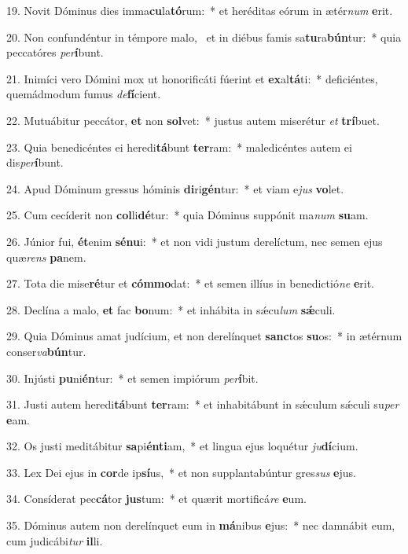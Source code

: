 19. Novit Dóminus dies imma\textbf{cu}la\textbf{tó}rum:~*  et heréditas eórum in ætér\textit{num} \textbf{e}rit.\

20. Non confundéntur in témpore malo, \dag\  et in diébus famis sa\textbf{tu}ra\textbf{bún}tur:~*  quia peccatóres \textit{per}\textbf{í}bunt.\

21. Inimíci vero Dómini mox ut honorificáti fúerint et \textbf{ex}al\textbf{tá}ti:~*  deficiéntes, quemádmodum fumus \textit{de}\textbf{fí}cient.\

22. Mutuábitur peccátor, \textbf{et} non \textbf{sol}vet:~*  justus autem miserétur \textit{et} \textbf{trí}buet.\

23. Quia benedicéntes ei heredi\textbf{tá}bunt \textbf{ter}ram:~*  maledicéntes autem ei dis\textit{per}\textbf{í}bunt.\

24. Apud Dóminum gressus hóminis \textbf{di}ri\textbf{gén}tur:~*  et viam e\textit{jus} \textbf{vo}let.\

25. Cum cecíderit non \textbf{col}li\textbf{dé}tur:~*  quia Dóminus suppónit ma\textit{num} \textbf{su}am.\

26. Júnior fui, \textbf{ét}enim \textbf{sé}\textbf{nu}i:~*  et non vidi justum derelíctum, nec semen ejus quæ\textit{rens} \textbf{pa}nem.\

27. Tota die mise\textbf{ré}tur et \textbf{cóm}\textbf{mo}dat:~*  et semen illíus in benedictió\textit{ne} \textbf{e}rit.\

28. Declína a malo, \textbf{et} fac \textbf{bo}num:~*  et inhábita in sǽcu\textit{lum} \textbf{sǽ}culi.\

29. Quia Dóminus amat judícium, et non derelínquet \textbf{sanc}tos \textbf{su}os:~*  in ætérnum conser\textit{va}\textbf{bún}tur.\

30. Injústi \textbf{pu}ni\textbf{én}tur:~*  et semen impiórum \textit{per}\textbf{í}bit.\

31. Justi autem heredi\textbf{tá}bunt \textbf{ter}ram:~*  et inhabitábunt in sǽculum sǽculi su\textit{per} \textbf{e}am.\

32. Os justi meditábitur \textbf{sa}pi\textbf{én}\textbf{ti}am,~*  et lingua ejus loquétur \textit{ju}\textbf{dí}cium.\

33. Lex Dei ejus in \textbf{cor}de ip\textbf{sí}us,~*  et non supplantabúntur gres\textit{sus} \textbf{e}jus.\

34. Consíderat pec\textbf{cá}tor \textbf{jus}tum:~*  et quærit mortificá\textit{re} \textbf{e}um.\

35. Dóminus autem non derelínquet eum in \textbf{má}nibus \textbf{e}jus:~*  nec damnábit eum, cum judicábi\textit{tur} \textbf{il}li.\

